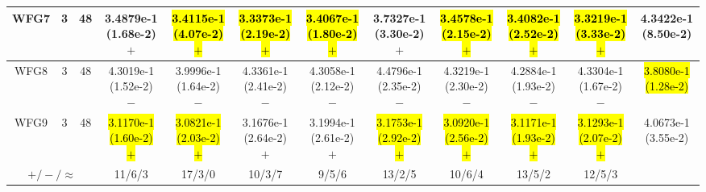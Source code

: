 \documentclass[journal]{IEEEtran}
\begin{document}
\begin{table*}[htbp]
\begin{tabular}{cccccccccccc}
\hline
\multirow{1}{*}{WFG7}&3&48&3.4879e-1 (1.68e-2) $+$&\hl{3.4115e-1 (4.07e-2) $+$}&\hl{3.3373e-1 (2.19e-2) $+$}&\hl{3.4067e-1 (1.80e-2) $+$}&3.7327e-1 (3.30e-2) $+$&\hl{3.4578e-1 (2.15e-2) $+$}&\hl{3.4082e-1 (2.52e-2) $+$}&\hl{3.3219e-1 (3.33e-2) $+$}&4.3422e-1 (8.50e-2)\\
\hline
\multirow{1}{*}{WFG8}&3&48&4.3019e-1 (1.52e-2) $-$&3.9996e-1 (1.64e-2) $-$&4.3361e-1 (2.41e-2) $-$&4.3058e-1 (2.12e-2) $-$&4.4796e-1 (2.35e-2) $-$&4.3219e-1 (2.30e-2) $-$&4.2884e-1 (1.93e-2) $-$&4.3304e-1 (1.67e-2) $-$&\hl{3.8080e-1 (1.28e-2)}\\
\hline
\multirow{1}{*}{WFG9}&3&48&\hl{3.1170e-1 (1.60e-2) $+$}&\hl{3.0821e-1 (2.03e-2) $+$}&3.1676e-1 (2.64e-2) $+$&3.1994e-1 (2.61e-2) $+$&\hl{3.1753e-1 (2.92e-2) $+$}&\hl{3.0920e-1 (2.56e-2) $+$}&\hl{3.1171e-1 (1.93e-2) $+$}&\hl{3.1293e-1 (2.07e-2) $+$}&4.0673e-1 (3.55e-2)\\
\hline
\multicolumn{3}{c}{$+/-/\approx$}&11/6/3&17/3/0&10/3/7&9/5/6&13/2/5&10/6/4&13/5/2&12/5/3&\\
\bottomrule
\end{tabular}
\label{No Label}
\end{table*}
\end{document}
